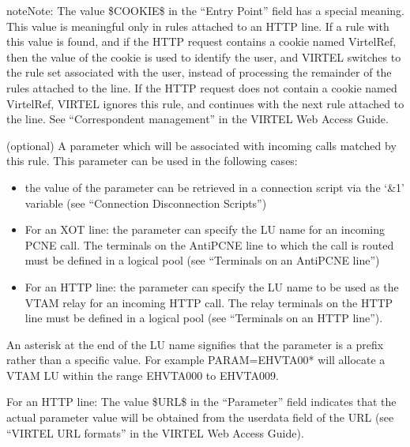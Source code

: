 \documentclass[letterpaper,10pt,english]{sphinxmanual}
\begin{document}
\begin{sphinxadmonition}{note}{Note:}
\sphinxAtStartPar
The value \$COOKIE\$ in the “Entry Point” field has a special meaning. This value is meaningful only in rules attached to an HTTP line. If a rule with this value is found, and if the HTTP request contains a cookie named VirtelRef, then the value of the cookie is used to identify the user, and VIRTEL switches to the rule set associated with the user, instead of processing the remainder of the rules attached to the line. If the HTTP request does not contain a cookie named VirtelRef, VIRTEL ignores this rule, and continues with the next rule attached to the line. See “Correspondent management” in the VIRTEL Web Access Guide.
\end{sphinxadmonition}
\begin{description}
\sphinxAtStartPar
(optional) A parameter which will be associated with incoming calls matched by this rule. This parameter can be used in the following cases:
\begin{itemize}
\item {} 
\sphinxAtStartPar
the value of the parameter can be retrieved in a connection script via the ‘\&1’ variable (see “Connection \textendash{} Disconnection Scripts”)

\item {} 
\sphinxAtStartPar
For an XOT line: the parameter can specify the LU name for an incoming PCNE call. The terminals on the AntiPCNE line to which the call is routed must be defined in a logical pool (see “Terminals on an AntiPCNE line”)

\item {} 
\sphinxAtStartPar
For an HTTP line: the parameter can specify the LU name to be used as the VTAM relay for an incoming HTTP call. The relay terminals on the HTTP line must be defined in a logical pool (see “Terminals on an HTTP line”).

\end{itemize}

\end{description}

\sphinxAtStartPar
An asterisk at the end of the LU name signifies that the parameter is a prefix rather than a specific value. For example PARAM=EHVTA00* will allocate a VTAM LU within the range EHVTA000 to EHVTA009.

\sphinxAtStartPar
For an HTTP line: The value \$URL\$ in the “Parameter” field indicates that the actual parameter value will be obtained
from the userdata field of the URL (see “VIRTEL URL formats” in the VIRTEL Web Access Guide).
\end{document}
